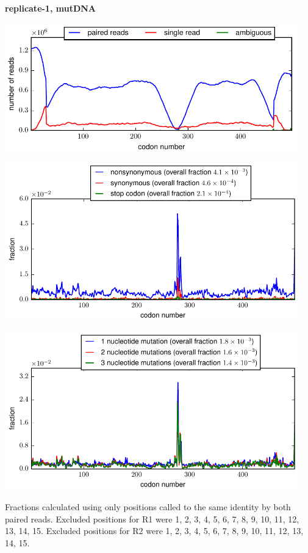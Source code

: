 \documentclass[10pt,letterpaper]{article}
\begin{document}
\centerline{\Large \bf replicate-1, mutDNA}
\vspace{0.1in}

\centerline{\includegraphics[width=5in]{replicate-1-mutDNA_codondepth.pdf}}
\vspace{0.1in}

\centerline{\includegraphics[width=5in]{replicate-1-mutDNA_syn-ns-dist.pdf}}
\vspace{0.1in}

\centerline{\includegraphics[width=5in]{replicate-1-mutDNA_nmutspercodon-dist.pdf}}
\vspace{0.1in}

Fractions calculated using only positions called to the same identity by both paired reads.  Excluded positions for R1 were 1, 2, 3, 4, 5, 6, 7, 8, 9, 10, 11, 12, 13, 14, 15. 
 Excluded positions for R2 were 1, 2, 3, 4, 5, 6, 7, 8, 9, 10, 11, 12, 13, 14, 15. 
\end{document}
